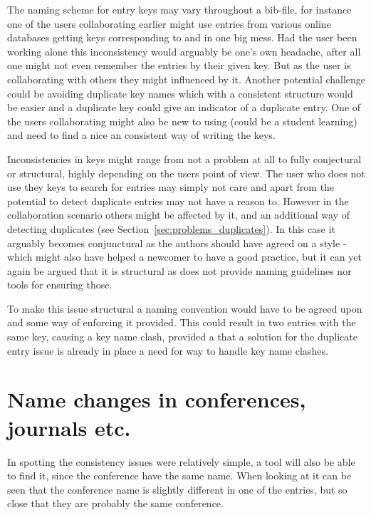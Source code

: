 The naming scheme for entry keys may vary throughout a bib-file, for
instance one of the users collaborating earlier might use entries from
various online databases getting keys corresponding to
 and 
in one big mess.  Had the user been working alone this inconsistency
would arguably be one's own headache, after all one might not even
remember the entries by their given key. But as the user is
collaborating with others they might influenced by it.  Another
potential challenge could be avoiding duplicate key names which with a
consistent structure would be easier and a duplicate key could give an
indicator of a duplicate entry.  One of the users collaborating might
also be new to using {\bibtex} (could be a student learning) and need
to find a nice an consistent way of writing the keys.

Inconsistencies in keys might range from not a problem at all to fully
conjectural or structural, highly depending on the users point of
view.  The user who does not use they keys to search for entries may
simply not care and apart from the potential to detect duplicate
entries may not have a reason to.  However in the collaboration
scenario others might be affected by it, and an additional way of
detecting duplicates (see Section~\ref{sec:problems_duplicates}).  In
this case it arguably becomes conjunctural as the authors should have
agreed on a style - which might also have helped a newcomer to have a
good practice, but it can yet again be argued that it is structural as
{\bibtex} does not provide naming guidelines nor tools for ensuring
those.

To make this issue structural a naming convention would have to be
agreed upon and some way of enforcing it provided.  This could result
in two entries with the same key, causing a key name clash, provided
a that a solution for the duplicate entry issue is already in place a
need for way to handle key name clashes.


\section{Name changes in conferences, journals etc.}
\label{sec:problems_name_changes}

In  spotting the consistency
issues were relatively simple, a tool will also be able to find it,
since the conference have the same name.  When looking at
 it can be seen that the
conference name is slightly different in one of the entries, but so
close that they are probably the same conference.

